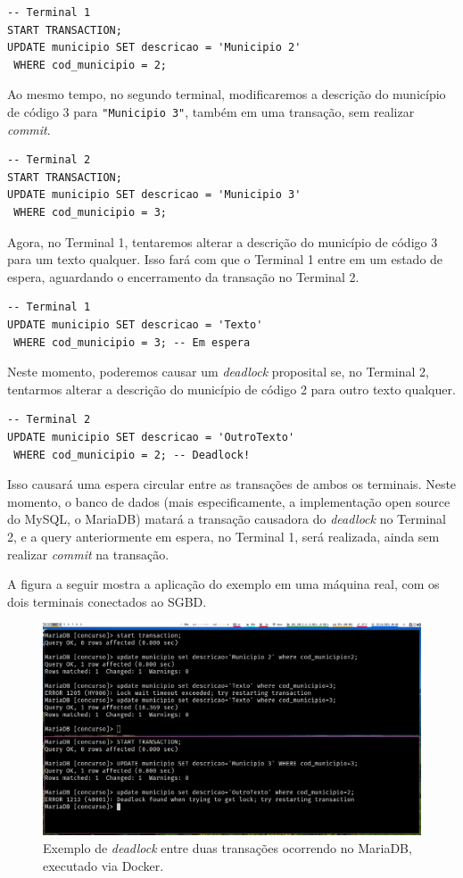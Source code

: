 \documentclass[article, a4paper, oneside, 11pt, english, brazil, sumario=tradicional]{abntex2}
\begin{document}
\begin{verbatim}
-- Terminal 1
START TRANSACTION;
UPDATE municipio SET descricao = 'Municipio 2'
 WHERE cod_municipio = 2;
\end{verbatim}

Ao mesmo tempo,  no segundo terminal, modificaremos a descrição  do município de
código 3 para \texttt{"Municipio 3"}, também em uma transação, sem realizar \emph{commit}.

\begin{verbatim}
-- Terminal 2
START TRANSACTION;
UPDATE municipio SET descricao = 'Municipio 3'
 WHERE cod_municipio = 3;
\end{verbatim}

Agora, no  Terminal 1, tentaremos alterar  a descrição do município  de código 3
para um  texto qualquer. Isso fará  com que o Terminal  1 entre em um  estado de
espera, aguardando o encerramento da transação no Terminal 2.

\begin{verbatim}
-- Terminal 1
UPDATE municipio SET descricao = 'Texto'
 WHERE cod_municipio = 3; -- Em espera
\end{verbatim}

Neste  momento, poderemos  causar um  \emph{deadlock} proposital  se, no  Terminal 2,
tentarmos  alterar  a descrição  do  município  de  código  2 para  outro  texto
qualquer.

\begin{verbatim}
-- Terminal 2
UPDATE municipio SET descricao = 'OutroTexto'
 WHERE cod_municipio = 2; -- Deadlock!
\end{verbatim}

Isso   causará  uma   espera  circular   entre   as  transações   de  ambos   os
terminais.  Neste   momento,  o   banco  de   dados  (mais   especificamente,  a
implementação open source  do MySQL, o MariaDB) matará a  transação causadora do
\emph{deadlock} no Terminal 2, e a query anteriormente em espera, no Terminal 1, será
realizada, ainda sem realizar \emph{commit} na transação.

A figura a seguir mostra a aplicação do exemplo em uma máquina real, com os dois
terminais conectados ao SGBD.

\begin{figure}[H]
\centering
\includegraphics[width=.9\linewidth]{./deadlock.png}
\caption{Exemplo de \emph{deadlock} entre duas transações ocorrendo no MariaDB, executado via Docker.}
\end{figure}
\end{document}
